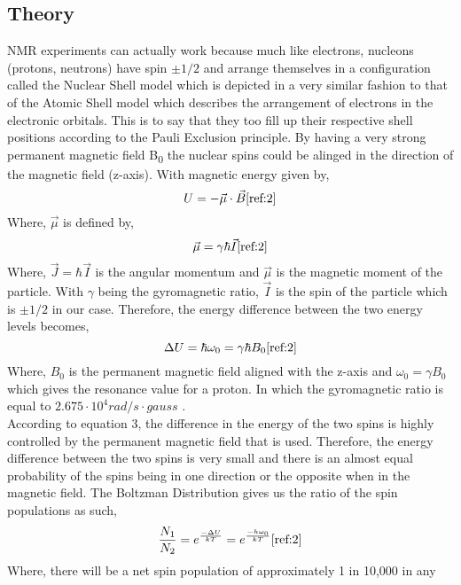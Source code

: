 \documentclass{article}
\begin{document}
{\begin{multicols}{2}
\section{Theory}
NMR experiments can actually work because much like electrons, nucleons 
(protons, neutrons) have spin $\pm1/2$ and arrange themselves in 
a configuration called the Nuclear Shell model which is depicted in a very 
similar fashion to that of the Atomic Shell model which describes the 
arrangement 
of electrons in the electronic orbitals. This is to say that they too fill up 
their 
respective shell positions according to the Pauli Exclusion principle. By 
having a very strong permanent magnetic field B\textsubscript{0} the nuclear 
spins could be alinged in the direction of the magnetic field (z-axis). With 
magnetic energy given by,
\begin{equation} %
U = -\vec{\mu}\cdot\vec{B}
\label{eqn:1}
\cite{ref:2}
\end{equation}
Where, $\vec{\mu}$ is defined by,
\begin{equation} %
\vec{\mu} = \gamma\hbar\vec{I}
\label{eqn:2}
\cite{ref:2}
\end{equation}
Where, $\vec{J} = \hbar\vec{I}$ is the angular momentum and $\vec{\mu}$ is the 
magnetic moment of the particle. With $\gamma$ being the gyromagnetic ratio, 
$\vec{I}$ is the spin of the particle which is $\pm1/2$ in our case. Therefore, 
the energy difference between the two energy levels becomes,
\begin{equation} %
\Delta U = \hbar\omega_0 = \gamma\hbar B_0
\label{eqn:3}
\cite{ref:2}
\end{equation}
Where, $B_0$ is the permanent magnetic field aligned with the z-axis and 
$\omega_0 = \gamma B_0$ which gives the resonance value for a proton. In which 
the gyromagnetic ratio is equal to $2.675 \cdot 10^4 rad/s\cdot gauss$
\cite{ref:2}.
\\
According to equation 3, the difference in the energy of the two spins is 
highly controlled by the permanent magnetic field that is used. Therefore, the 
energy difference between the two spins is very small and there is an almost 
equal probability of the spins being in one direction or the opposite when in 
the magnetic field. The Boltzman Distribution gives us the ratio of the spin 
populations as such,
\begin{equation} %
\frac{N_1}{N_2} = e^{\frac{-\Delta U}{kT}} = e^{\frac{-h\omega_0}{kT}}
\label{eqn:4}
\cite{ref:2}
\end{equation}
Where, there will be a net spin population of approximately 1 in 10,000 in any 

\end{multicols}}
\end{document}

